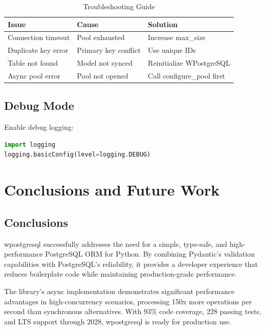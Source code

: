 \documentclass[12pt,a4paper]{report}
\begin{document}
\begin{table}[H]
	\centering
	\caption{Troubleshooting Guide}
	\begin{tabular}{@{}lll@{}}
		\toprule
		\textbf{Issue}      & \textbf{Cause}       & \textbf{Solution}          \\
		\midrule
		Connection timeout  & Pool exhausted       & Increase max\_size         \\
		Duplicate key error & Primary key conflict & Use unique IDs             \\
		Table not found     & Model not synced     & Reinitialize WPostgreSQL   \\
		Async pool error    & Pool not opened      & Call configure\_pool first \\
		\bottomrule
	\end{tabular}
\end{table}

\section{Debug Mode}

Enable debug logging:

\begin{lstlisting}[language=Python, caption=Debug Configuration]
import logging
logging.basicConfig(level=logging.DEBUG)
\end{lstlisting}

\chapter{Conclusions and Future Work}

\section{Conclusions}

wpostgresql successfully addresses the need for a simple, type-safe, and high-performance PostgreSQL ORM for Python. By combining Pydantic's validation capabilities with PostgreSQL's reliability, it provides a developer experience that reduces boilerplate code while maintaining production-grade performance.

The library's async implementation demonstrates significant performance advantages in high-concurrency scenarios, processing 150x more operations per second than synchronous alternatives. With 93\% code coverage, 228 passing tests, and LTS support through 2028, wpostgresql is ready for production use.
\end{document}
